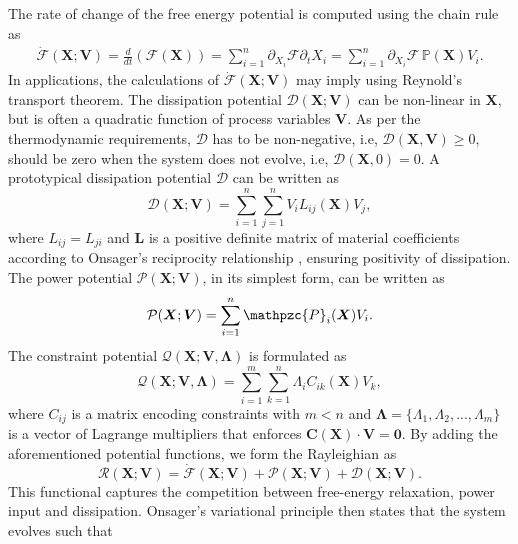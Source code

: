 The rate of change of the free energy potential is computed using the chain rule as
\begin{align}
	\dot{\mathcal{F}}(\bm{X};\bm{V}) =    \frac{d}{dt}\left(\mathcal{F}(\bm{X})\right)   =  \sum_{i=1}^n \partial_{X_i} \mathcal{F} \partial_t X_i 	=  \sum_{i=1}^n \partial_{X_i} \mathcal{F}\, \mathbb{P}(\bm{X})V_i. 
\end{align}
In applications, the calculations of $\dot{\mathcal{F}}(\bm{X};\bm{V})$ may imply using  Reynold's transport theorem. The dissipation potential $\mathcal{D}\left(\bm{X};\bm{V}\right)$ can be non-linear in $\bm{X}$, but is often a quadratic function of process variables $\bm{V}$. As per the thermodynamic requirements, $\mathcal{D}$ has to be non-negative, i.e, $\mathcal{D}(\bm{X},\bm{V}) \geq 0$, should be zero when the system does not evolve, i.e, $\mathcal{D}(\bm{X},0)=0$. A prototypical dissipation potential  $\mathcal{D}$ can be written as
\begin{equation}
	\mathcal{D}\left(\bm{X};\bm{V}\right) = \sum_{i=1}^{n}\sum_{j=1}^{n}V_i L_{ij}(\bm{X}) V_j,
\end{equation}
where  $L_{ij}=L_{ji}$ and $\bm{L}$ is a positive definite matrix of material coefficients according to Onsager's reciprocity relationship \cite{Onsager1931}, ensuring positivity of dissipation. The power potential $\mathcal{P}(\bm{X};\bm{V})$, in its simplest form, can be written as 
\begin{equation}
	\mathcal{P}(\bm{X};\bm{V}) = \sum_{i=1}^{n} \mathpzc{P}_{i}(\bm{X}) V_i.
\end{equation}
The constraint potential $\mathcal{Q}(\bm{X};\bm{V},\bm{\Lambda})$ is formulated as  
\begin{equation}
	\mathcal{Q}(\bm{X};\bm{V},\bm{\Lambda}) = \sum_{i=1}^{m}   \sum_{k=1}^{n} \Lambda_i C_{ik}(\bm{X})V_k ,
\end{equation}
where $C_{ij}$ is a matrix encoding constraints with $m<n$ and $\bm{\Lambda} = \{\Lambda_1, \Lambda_2, ... , \Lambda_m \}$ is a vector of Lagrange multipliers that enforces  $\bm{C}(\bm{X})\cdot \bm{V} = \bm{0}$.  By adding the aforementioned potential functions, we  form the Rayleighian as
\begin{equation}
	\mathcal{R}(\bm{X};\bm{V}) =  \dot{\mathcal{F}}(\bm{X};\bm{V}) + \mathcal{P}(\bm{X};\bm{V}) + \mathcal{D}(\bm{X};\bm{V}) .
\end{equation}
This functional captures the competition between free-energy relaxation, power input and dissipation.
Onsager’s variational principle then states that the system evolves such that
